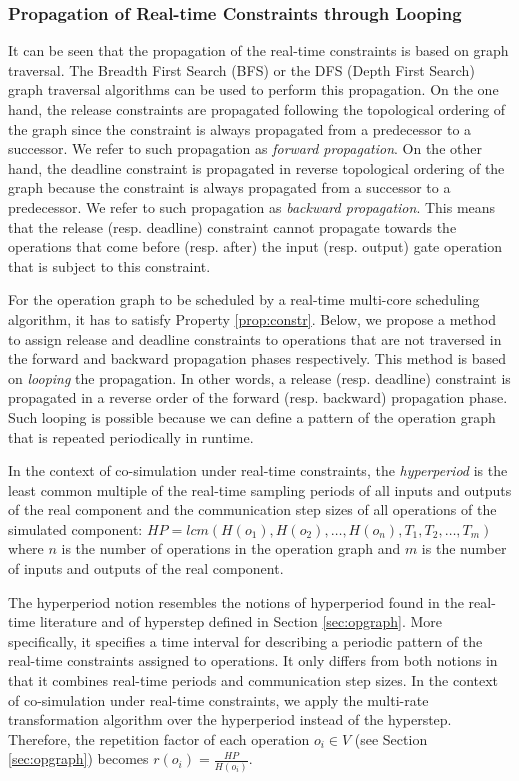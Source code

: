 \subsubsection{Propagation of Real-time Constraints through Looping}

It can be seen that the propagation of the real-time constraints is based on graph traversal. The Breadth First Search (BFS) or the DFS (Depth First Search) graph traversal algorithms can be used to perform this propagation. On the one hand, the release constraints are propagated following the topological ordering of the graph since the constraint is always propagated from a predecessor to a successor. We refer to such propagation as \textit{forward propagation}. On the other hand, the deadline constraint is propagated in reverse topological ordering of the graph because the constraint is always propagated from a successor to a predecessor. We refer to such propagation as \textit{backward propagation}. This means that the release (resp. deadline) constraint cannot propagate towards the operations that come before (resp. after) the input (resp. output) gate operation that is subject to this constraint.

For the operation graph to be scheduled by a real-time multi-core scheduling algorithm, it has to satisfy Property \ref{prop:constr}. Below, we propose a method to assign release and deadline constraints to operations that are not traversed in the forward and backward propagation phases respectively. This method is based on \textit{looping} the propagation. In other words, a release (resp. deadline) constraint is propagated in a reverse order of the forward (resp. backward) propagation phase. Such looping is possible because we can define a pattern of the operation graph that is repeated periodically in runtime.

\begin{definition}
In the context of co-simulation under real-time constraints, the \textit{hyperperiod} is the least common multiple of the real-time sampling periods of all inputs and outputs of the real component and the communication step sizes of all operations of the simulated component: $HP=lcm(H(o_1),H(o_2), \dots ,\allowbreak H(o_n), T_1, T_2, \dots ,T_m)$ where $n$ is the number of operations in the operation graph and $m$ is the number of inputs and outputs of the real component.
\label{def:hyperperiod}
\end{definition}

The hyperperiod notion resembles the notions of hyperperiod found in the real-time literature and of hyperstep defined in Section \ref{sec:opgraph}. More specifically, it specifies a time interval for describing a periodic pattern of the real-time constraints assigned to operations. It only differs from both notions in that it combines real-time periods and communication step sizes. In the context of co-simulation under real-time constraints, we apply the multi-rate transformation algorithm over the hyperperiod instead of the hyperstep. Therefore, the repetition factor of each operation $o_i \in V$ (see Section \ref{sec:opgraph}) becomes $r(o_i) = \frac{HP}{H(o_i)}$.

